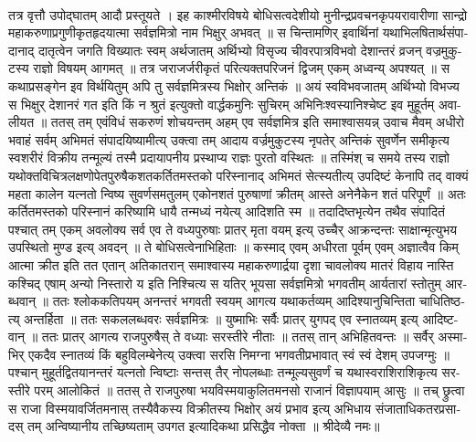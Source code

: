 \documentclass[a4paper, 11pt, oneside, french, landscape, twocolumn]{article}
\begin{document}
\paragraph{}
\texthindi{तत्र वृत्तौ उपोद्घातम् आदौ प्रस्तूयते । इह काश्मीरविषये बोधिसत्वदेशीयो मुनीन्द्रप्रवचनकृपयरावारीणा सान्द्रो महाकरुणाप्रगुणीकृतहृदयात्मा सर्वज्ञमित्रो नाम भिक्षुर् अभवत् ॥ स चिन्तामणिर् इवार्थिनां यथाभिलषितार्थसंपादानाद् दातृत्वेन जगति विख्यातः स्वम् अर्थजातम् अर्थिभ्यो विसृज्य चीवरपात्रविभवो देशान्तरं व्रजन् वज्रमुकुटस्य राज्ञो विषयम् आगमत् ॥ तत्र जराजर्जरीकृतं परित्यक्तपरिजनं द्विजम् एकम् अध्वन्य् अपश्यत् ॥ स कथाप्रसङ्गेन इव विर्थयितुम् अपि तु सर्वज्ञमित्रस्य भिक्षोर् अन्तिकं ॥ अयं स्वविभवजातम् अर्थिभ्यो विभज्य स भिक्षुर् देशानरं गत इति किं न श्रुतं इत्युक्तो वार्द्धकमुनिः सुचिरम् अभिनिःश्वस्यानिश्चेष्ट इव मुहूर्तम् अवालीयत ॥ ततस् तम् एवंविधं सकरुणं शोचयन्तम् अहम् एव सर्वज्ञमित्र इति समाश्वासयन्न् उवाच मैवम् अधीरो भवाहं सर्वम् अभिमतं संपादयिष्यामीत्य् उक्त्वा तम् आदाय वर्ज्रमुकुटस्य नृपतेर् अन्तिकं सुवर्णेन समीकृत्य स्वशरीरं विक्रीय तन्मूल्यं तस्मै प्रदायापनीय प्रस्थाप्य राज्ञः पुरतो वस्थितः ॥ तस्मिंश् च समये तस्य राज्ञो यथोक्तविचित्रलक्षणोपेतपुरुषैकशतकर्तितमस्तको परिस्नानाद् अभिमतं सेत्स्यतीत्य् उपदिष्टं केनापि तद् वाक्यं महता कालेन यत्नतो न्विष्य सुवर्णसमतुलम् एकोनशतं पुरुषाणां क्रीतम् आस्ते अनेनैकेन शतं परिपूर्णं ॥ अतः कर्तितमस्तको परिस्नानं करिष्यामि धायै तन्मध्यं नयेत्य् आदिशति स्म ॥ तदादिष्तभृत्येन तथैव संपादितं पश्चात् तम् एकम् अवलोक्य सर्व एव ते वध्यपुरुषाः प्रातर् मृता वयम् इत्य् उच्चैर् आक्रन्दन्तः साक्षान्मृत्युभय उपस्थितो मुण्ड इत्य् अवदन् ॥ ते बोधिसत्वेनाभिहिताः ॥ कस्माद् एवम् अधीरता पूर्वम् एवम् अज्ञात्वैव किम् आत्मा क्रीत इति तत एतान् अतिकातरान् समाश्वास्य महाकरुणार्द्रया दृशा चावलोक्य मातरं विहाय नास्ति कश्चिद् एषाम् अन्यो निस्तारो य इति निश्चित्य स यतिर् भूयसा सर्वज्ञमित्रो भगवतीम् आर्यतारां स्तोतुम् आरब्धवान् ॥ ततः श्लोककतिपयम् अनन्तरं भगवती स्वयम् आगत्य यथाकर्तव्यम् आदिश्यानुचिन्तिता चाधितिष्ठत्य् अन्तर्हिता ॥ ततः सकललब्धवरः सर्वज्ञमित्रः ॥ युष्माभिः सर्वैः प्रातर् युगपद् एव स्नातव्यम् इत्य् आदिष्टवान् ॥ ततः प्रातर् आगत्य राजपुरुषैस् ते वध्याः सरस्तीरे नीताः ॥ ततस् तान् अभिहितवन्तः ॥ सर्वैर् अस्माभिर् एकदैव स्नातव्यं किं बहुविलम्बेनेत्य् उक्त्वा सरसि निमग्ना भगवतीप्रभावात् स्वं स्वं देशम् उपजग्मुः ॥ पश्चान् मुहूर्तद्वितयानन्तरं यत्नतो न्विष्टाः सन्तस् तैर् नोपलब्धाः तन्मूल्यसुवर्णं च यथास्वराशिराशिकृत्य सरस्तीरे परम् आलोकितं ॥ ततस् ते राजपुरुषा भयविस्मयाकुलितमनसो राजानं विज्ञापयाम् आसुः ॥ तच् छ्रुत्वा स राजा विस्मयावर्जितमनास् तस्यैवैकस्य विक्रीतस्य भिक्षोर् अयं प्रभाव इत्य् अभिधाय संजाताधिकतरप्रसादस् तम् अन्विष्यानीय तच्छिष्यताम् उपगत इत्यादिकथा प्रसिद्धैव नोक्ता ॥ श्रीदेव्यै नमः॥}
\clearpage
\end{document}
